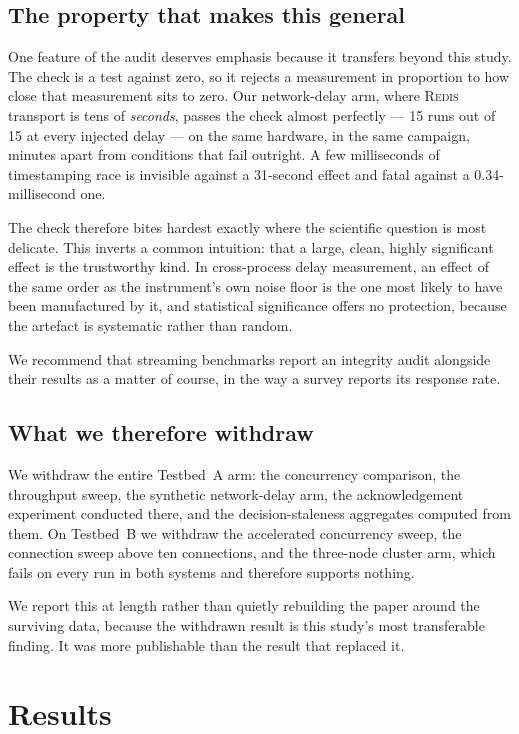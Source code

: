 \documentclass[Afour,sageh,times]{sagej}
\newcommand{\redis}{\textsc{Redis}}
\begin{document}
\subsection{The property that makes this general}
\label{sec:gateproperty}

One feature of the audit deserves emphasis because it transfers beyond this study. The check is a
test against zero, so it rejects a measurement in proportion to how close that measurement sits to
zero. Our network-delay arm, where \redis{} transport is tens of \emph{seconds}, passes the check
almost perfectly --- 15 runs out of 15 at every injected delay --- on the same hardware, in the
same campaign, minutes apart from conditions that fail outright. A few milliseconds of
timestamping race is invisible against a 31-second effect and fatal against a
0.34-millisecond one.

The check therefore bites hardest exactly where the scientific question is most delicate. This
inverts a common intuition: that a large, clean, highly significant effect is the trustworthy
kind. In cross-process delay measurement, an effect of the same order as the instrument's own
noise floor is the one most likely to have been manufactured by it, and statistical significance
offers no protection, because the artefact is systematic rather than random.

We recommend that streaming benchmarks report an integrity audit alongside their results as a
matter of course, in the way a survey reports its response rate.

\subsection{What we therefore withdraw}
\label{sec:withdrawn}

We withdraw the entire Testbed~A arm: the concurrency comparison, the throughput sweep, the
synthetic network-delay arm, the acknowledgement experiment conducted there, and the
decision-staleness aggregates computed from them. On Testbed~B we withdraw the accelerated
concurrency sweep, the connection sweep above ten connections, and the three-node cluster arm,
which fails on every run in both systems and therefore supports nothing.

We report this at length rather than quietly rebuilding the paper around the surviving data,
because the withdrawn result is this study's most transferable finding. It was more publishable
than the result that replaced it.


\section{Results}
\label{sec:results}
\end{document}
